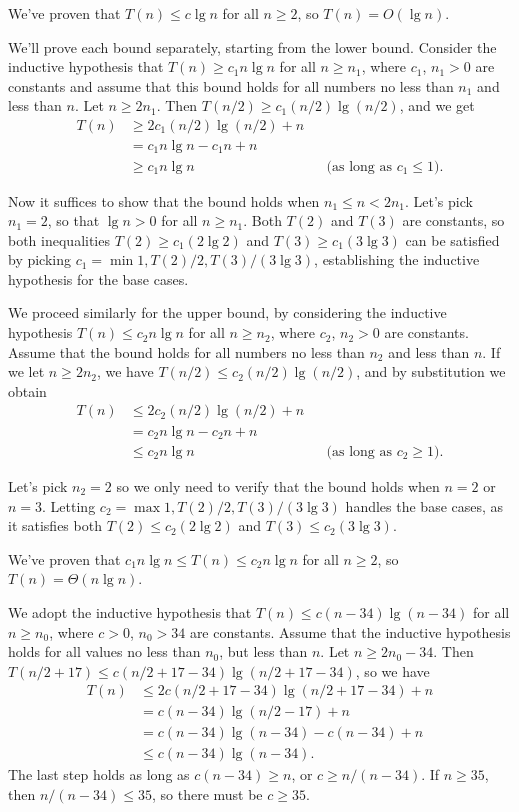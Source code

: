 We've proven that $T(n)\le c\lg n$ for all $n\ge2$, so $T(n)=O(\lg n)$.

\subexercise
We'll prove each bound separately, starting from the lower bound.
Consider the inductive hypothesis that $T(n)\ge c_1n\lg n$ for all $n\ge n_1$, where $c_1$, $n_1>0$ are constants and assume that this bound holds for all numbers no less than $n_1$ and less than $n$.
Let $n\ge2n_1$.
Then $T(n/2)\ge c_1(n/2)\lg(n/2)$, and we get
\begin{align*}
    T(n) &\ge 2c_1(n/2)\lg(n/2)+n \\
    &= c_1n\lg n-c_1n+n \\
    &\ge c_1n\lg n && \text{(as long as $c_1\le1$)}.
\end{align*}

Now it suffices to show that the bound holds when $n_1\le n<2n_1$.
Let's pick $n_1=2$, so that $\lg n>0$ for all $n\ge n_1$.
Both $T(2)$ and $T(3)$ are constants, so both inequalities $T(2)\ge c_1(2\lg2)$ and $T(3)\ge c_1(3\lg3)$ can be satisfied by picking $c_1=\min{1,T(2)/2,T(3)/(3\lg3)}$, establishing the inductive hypothesis for the base cases.

We proceed similarly for the upper bound, by considering the inductive hypothesis $T(n)\le c_2n\lg n$ for all $n\ge n_2$, where $c_2$, $n_2>0$ are constants.
Assume that the bound holds for all numbers no less than $n_2$ and less than $n$.
If we let $n\ge2n_2$, we have $T(n/2)\le c_2(n/2)\lg(n/2)$, and by substitution we obtain
\begin{align*}
    T(n) &\le 2c_2(n/2)\lg(n/2)+n \\
    &= c_2n\lg n-c_2n+n \\
    &\le c_2n\lg n && \text{(as long as $c_2\ge1$)}.
\end{align*}

Let's pick $n_2=2$ so we only need to verify that the bound holds when $n=2$ or $n=3$.
Letting $c_2=\max{1,T(2)/2,T(3)/(3\lg3)}$ handles the base cases, as it satisfies both $T(2)\le c_2(2\lg2)$ and $T(3)\le c_2(3\lg3)$.

We've proven that $c_1n\lg n\le T(n)\le c_2n\lg n$ for all $n\ge2$, so $T(n)=\Theta(n\lg n)$.

\subexercise
We adopt the inductive hypothesis that $T(n)\le c(n-34)\lg(n-34)$ for all $n\ge n_0$, where $c>0$, $n_0>34$ are constants.
Assume that the inductive hypothesis holds for all values no less than $n_0$, but less than $n$.
Let $n\ge2n_0-34$.
Then $T(n/2+17)\le c(n/2+17-34)\lg(n/2+17-34)$, so we have
\begin{align*}
    T(n) &\le 2c(n/2+17-34)\lg(n/2+17-34)+n \\
    &= c(n-34)\lg(n/2-17)+n \\
    &= c(n-34)\lg(n-34)-c(n-34)+n \\
    &\le c(n-34)\lg(n-34).
\end{align*}
The last step holds as long as $c(n-34)\ge n$, or $c\ge n/(n-34)$.
If $n\ge35$, then $n/(n-34)\le35$, so there must be $c\ge35$.

